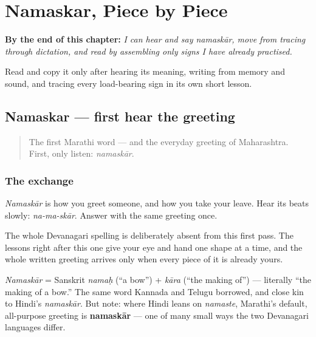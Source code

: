 
\chapter{Namaskar, Piece by Piece}
\label{ch:first-greeting-script}

\begin{chapteropening}
\textbf{By the end of this chapter:} \emph{I can hear and say namaskār, move  from tracing through dictation, and read  by assembling only signs I have already practised.}

Read  and copy it only after hearing its meaning, writing  from memory and sound, and tracing every load-bearing sign in its own short lesson.
\end{chapteropening}

\section[\texorpdfstring{\mr{नमस्कार} (namaskar)}{नमस्कार (namaskar)}]{Namaskar — first hear the greeting}

\label{lesson:MR-C01-namaskar}



\begin{quote}
The first Marathi word — and the everyday greeting of Maharashtra. First, only listen: \emph{namaskār}.
\end{quote}

\subsection*{The exchange}
\emph{Namaskār} is how you greet someone, and how you take your leave. Hear its beats slowly: \emph{na-ma-skār}. Answer with the same greeting once.

The whole Devanagari spelling is deliberately absent from this first pass. The lessons right after this one give your eye and hand one shape at a time, and the whole written greeting arrives only when every piece of it is already yours.

\begin{cousinweb}
\emph{Namaskār} = Sanskrit \emph{namaḥ} (\textquotedblleft{}a bow\textquotedblright{}) + \emph{kāra} (\textquotedblleft{}the making of\textquotedblright{}) — literally \textquotedblleft{}the making of a bow.\textquotedblright{} The same word Kannada and Telugu borrowed, and close kin to Hindi's \emph{namaskār}. But note: where Hindi leans on \emph{namaste}, Marathi's default, all-purpose greeting is \textbf{namaskār} — one of many small ways the two Devanagari languages differ.
\end{cousinweb}

